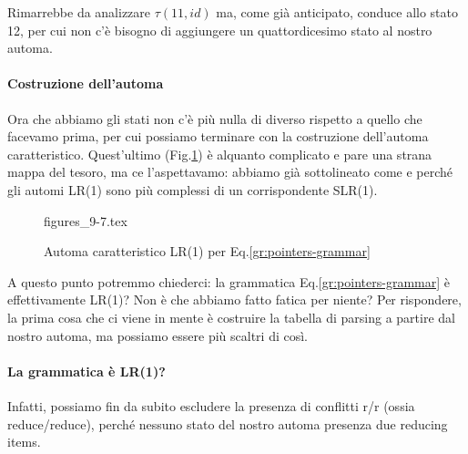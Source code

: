 \documentclass[class=book, crop=false, oneside, 12pt]{standalone}
\begin{document}
Rimarrebbe da analizzare \(\tau(11, id)\) ma, come già anticipato, conduce allo stato 12, per cui non c'è bisogno di aggiungere un quattordicesimo stato al nostro automa.

\paragraph{Costruzione dell'automa}
Ora che abbiamo gli stati non c'è più nulla di diverso rispetto a quello che facevamo prima, per cui possiamo terminare con la costruzione dell'automa caratteristico. Quest'ultimo (Fig.\ref{fig:pointers-automaton}) è alquanto complicato e pare una strana mappa del tesoro, ma ce l'aspettavamo: abbiamo già sottolineato come e perché gli automi LR(1) sono più complessi di un corrispondente SLR(1).
\begin{figure}[H]
    \centering
	{figures_9-7.tex}
    \caption{Automa caratteristico LR(1) per Eq.\ref{gr:pointers-grammar}}
    \label{fig:pointers-automaton}
\end{figure}
A questo punto potremmo chiederci: la grammatica Eq.\ref{gr:pointers-grammar} è effettivamente LR(1)? Non è che abbiamo fatto fatica per niente? Per rispondere, la prima cosa che ci viene in mente è costruire la tabella di parsing a partire dal nostro automa, ma possiamo essere più scaltri di così.
\paragraph{La grammatica è LR(1)?}
Infatti, possiamo fin da subito escludere la presenza di conflitti r/r (ossia reduce/reduce), perché nessuno stato del nostro automa presenza due reducing items.
\end{document}
